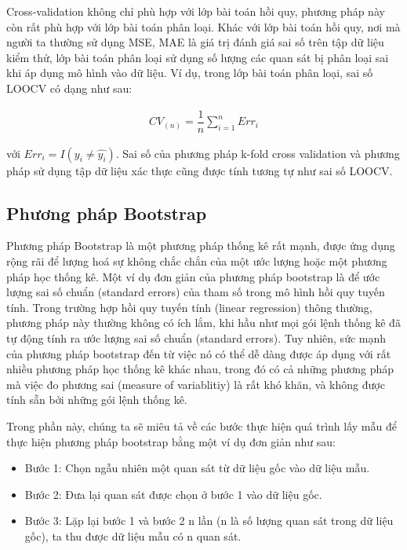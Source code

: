 \documentclass[
]{article}
\providecommand{\tightlist}{%
  \setlength{\itemsep}{0pt}\setlength{\parskip}{0pt}}
\begin{document}
Cross-validation không chỉ phù hợp với lớp bài toán hồi quy, phương pháp này còn rất phù hợp với lớp bài toán phân loại. Khác với lớp bài toán hồi quy, nơi mà người ta thường sử dụng MSE, MAE là giá trị đánh giá sai số trên tập dữ liệu kiểm thử, lớp bài toán phân loại sử dụng số lượng các quan sát bị phân loại sai khi áp dụng mô hình vào dữ liệu. Ví dụ, trong lớp bài toán phân loại, sai số LOOCV có dạng như sau:

\begin{align*}
CV_{(n)} = \dfrac{1}{n} \sum\limits_{i = 1}^{n} Err_i
\label{eq:class_cv}
\end{align*}

với \(Err_i = I(y_i \neq \hat{y_i})\). Sai số của phương pháp k-fold cross validation và phương pháp sử dụng tập dữ liệu xác thực cũng được tính tương tự như sai số LOOCV.

\hypertarget{phux1b0ux1a1ng-phuxe1p-bootstrap}{%
\subsection{Phương pháp Bootstrap}\label{phux1b0ux1a1ng-phuxe1p-bootstrap}}

Phương pháp Bootstrap là một phương pháp thống kê rất mạnh, được ứng dụng rộng rãi để lượng hoá sự không chắc chắn của một ước lượng hoặc một phương pháp học thống kê. Một ví dụ đơn giản của phương pháp bootstrap là để ước lượng sai số chuẩn (standard errors) của tham số trong mô hình hồi quy tuyến tính. Trong trường hợp hồi quy tuyến tính (linear regression) thông thường, phương pháp này thường không có ích lắm, khi hầu như mọi gói lệnh thống kê đã tự động tính ra ước lượng sai số chuẩn (standard errors). Tuy nhiên, sức mạnh của phương pháp bootstrap đến từ việc nó có thể dễ dàng được áp dụng với rất nhiều phương pháp học thống kê khác nhau, trong đó có cả những phương pháp mà việc đo phương sai (measure of variablitiy) là rất khó khăn, và không được tính sẵn bởi những gói lệnh thống kê.

Trong phần này, chúng ta sẽ miêu tả về các bước thực hiện quá trình lấy mẫu để thực hiện phương pháp bootstrap bằng một ví dụ đơn giản như sau:

\begin{itemize}
\tightlist
\item
  Bước 1: Chọn ngẫu nhiên một quan sát từ dữ liệu gốc vào dữ liệu mẫu.
\item
  Bước 2: Đưa lại quan sát được chọn ở bước 1 vào dữ liệu gốc.
\item
  Bước 3: Lặp lại bước 1 và bước 2 n lần (n là số lượng quan sát trong dữ liệu gốc), ta thu được dữ liệu mẫu có n quan sát.
\end{itemize}
\end{document}
